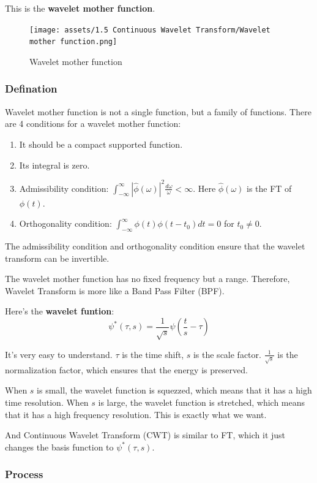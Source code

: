 \documentclass[12pt]{ctexart}
\begin{document}
This is the \textbf{wavelet mother function}.

\begin{figure}[H]
  \centering
  \texttt{[image: assets/1.5 Continuous Wavelet Transform/Wavelet
  mother function.png]}
  \caption{Wavelet mother function}
\end{figure}

\subsubsection{\textbf{Defination}}

Wavelet mother function is not a single function, but a family of functions. There are
4 conditions for a wavelet mother function:
\begin{enumerate}
  \item It should be a compact supported function.
  \item Its integral is zero.
  \item Admissibility condition: $\int_{-\infty}^{\infty} |\hat{\phi}(\omega)|^2
  \frac{d\omega}{\omega} < \infty$. Here $\hat{\phi}(\omega)$ is the FT of $\phi(t)$.
  \item Orthogonality condition: $\int_{-\infty}^{\infty} \phi(t) \phi(t - t_0) dt = 0$
  for $t_0 \neq 0$.
\end{enumerate}

The admissibility condition and orthogonality condition ensure that the wavelet transform
can be invertible.

The wavelet mother function has no fixed frequency but a range. Therefore, Wavelet Transform
is more like a Band Pass Filter (BPF).

Here's the \textbf{wavelet funtion}:
\[
  \psi^*(\tau,s) = \frac{1}{\sqrt{s}}\psi(\frac{t}{s}-\tau)
\]

It's very easy to understand. $\tau$ is the time shift, $s$ is the scale factor. $\frac{1}
{\sqrt{s}}$ is the normalization factor, which ensures that the energy is preserved.

When $s$ is small, the wavelet function is squezzed, which means that it has a high time
resolution. When $s$ is large, the wavelet function is stretched, which means that it has
a high frequency resolution. This is exactly what we want.

And Continuous Wavelet Transform (CWT) is similar to FT, which it just changes the basis
function to $\psi^*(\tau,s)$.

\subsubsection{\textbf{Process}}
\end{document}
